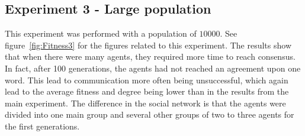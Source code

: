\subsection{Experiment 3 - Large population}
This experiment was performed with a population of $10000$. See figure~\ref{fig:Fitness3} for the figures related to this experiment. The results show that when there were many agents, they required more time to reach consensus. In fact, after 100 generations, the agents had not reached an agreement upon one word. This lead to communication more often being unsuccessful, which again lead to the average fitness and degree being lower than in the results from the main experiment. The difference in the social network is that the agents were divided into one main group and several other groups of two to three agents for the first generations.

